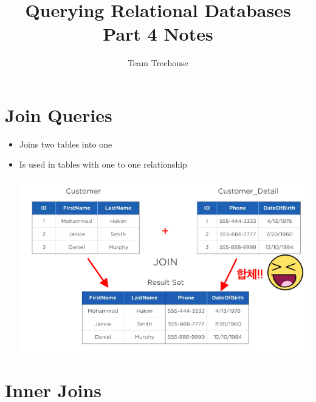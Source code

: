 \documentclass[12pt]{article}
\begin{document}
\title{Querying Relational Databases Part 4 Notes}
\author{Team Treehouse}
\maketitle

\bigskip

\section{Join Queries}

\bigskip

\begin{itemize}
    \item Joins two tables into one
    \item Is used in tables with one to one relationship

    \begin{center}
    \includegraphics[width=0.8\linewidth]{images/part_4_notes_1.png}
    \end{center}
\end{itemize}

\bigskip

\section{Inner Joins}

\bigskip
\end{document}
